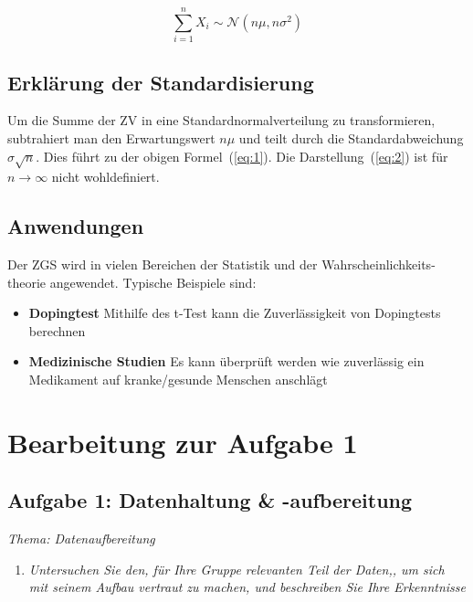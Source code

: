 \documentclass{article}
\begin{document}
\begin{equation}
    \sum_{i = 1}^n X_i \sim \mathcal{N}(n\mu, n\sigma^2) \label{eq:2}
\end{equation}
    




\subsection{Erklärung der Standardisierung}

Um die Summe der ZV in eine Standardnormalverteilung zu transformieren, subtrahiert man den Erwartungswert \(n\mu\) und teilt durch die Standardabweichung \(\sigma \sqrt{n}\). Dies führt zu der obigen Formel~(\ref{eq:1}). Die Darstellung~(\ref{eq:2}) ist für \(n \to \infty\) nicht wohldefiniert. 

\subsection{Anwendungen}
Der ZGS wird in vielen Bereichen der Statistik und der Wahrscheinlichkeits-
theorie angewendet. Typische Beispiele sind: 

\begin{itemize}
    \item \textbf{Dopingtest} Mithilfe des t-Test kann  die Zuverlässigkeit von Dopingtests berechnen 
    \item \textbf{Medizinische Studien} Es kann überprüft werden wie zuverlässig ein Medikament auf kranke/gesunde Menschen anschlägt 
\end{itemize}

\newpage

\section{Bearbeitung zur Aufgabe 1} 

\subsection{{Aufgabe 1: Datenhaltung \& -aufbereitung}} \hypertarget{Aufgabe 1}{} 
\textit{Thema: Datenaufbereitung} 

\begin{enumerate}
    \item \textit{Untersuchen Sie den, für Ihre Gruppe relevanten Teil der Daten,, um sich mit seinem Aufbau vertraut zu machen, und beschreiben Sie Ihre Erkenntnisse}
\end{enumerate}
\end{document}
